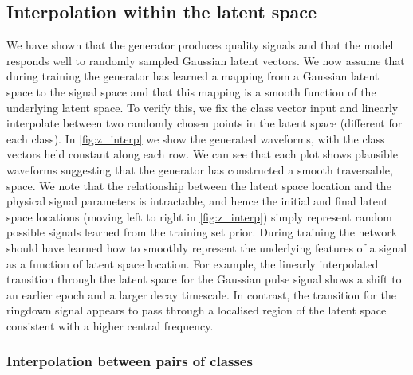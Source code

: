 \documentclass[12pt]{iopart}
\begin{document}
\subsection{Interpolation within the latent space}
%
%
 We have shown that the generator produces quality signals and that the model responds well to randomly sampled Gaussian latent vectors. We now assume that during training the generator has learned a mapping from a Gaussian latent space to the signal space and that this mapping is a smooth function of the underlying latent space. To verify this, we fix the class vector input and linearly interpolate between two randomly chosen points in the latent space (different for each class). In \cref{fig:z_interp} we show the generated waveforms, with the class vectors held constant along each row. We can see that each plot shows plausible waveforms suggesting that the generator has constructed a smooth traversable, space. We note that the relationship between the latent space location and the physical signal parameters is intractable, and hence the initial and final latent space locations (moving left to right in \cref{fig:z_interp}) simply represent random possible signals learned from the training set prior. During training the network should have learned how to smoothly represent the underlying features of a signal as a function of latent space location. For example, the linearly interpolated transition through the latent space for the Gaussian pulse signal shows a shift to an earlier epoch and a larger decay timescale. In contrast, the transition for the ringdown signal appears to pass through a localised region of the latent space consistent with a higher central frequency. 
\subsubsection{Interpolation between pairs of classes}
\end{document}
